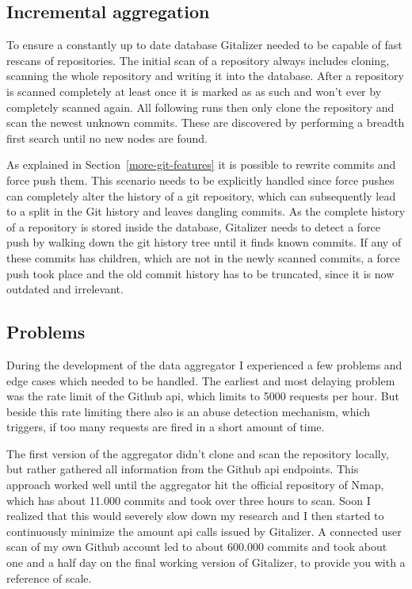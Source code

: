 \subsection{Incremental aggregation}
To ensure a constantly up to date database Gitalizer needed to be capable of fast rescans of repositories.
The initial scan of a repository always includes cloning, scanning the whole repository and writing it into the database.
After a repository is scanned completely at least once it is marked as as such and won't ever by completely scanned again.
All following runs then only clone the repository and scan the newest unknown commits.
These are discovered by performing a breadth first search until no new nodes are found.

As explained in Section~\ref{more-git-features} it is possible to rewrite commits and force push them.
This scenario needs to be explicitly handled since force pushes can completely alter the history of a git repository, which can subsequently lead to a split in the Git history and leaves dangling commits.
As the complete history of a repository is stored inside the database, Gitalizer needs to detect a force push by walking down the git history tree until it finds known commits.
If any of these commits has children, which are not in the newly scanned commits, a force push took place and the old commit history has to be truncated, since it is now outdated and irrelevant.


\subsection{Problems}
During the development of the data aggregator I experienced a few problems and edge cases which needed to be handled.
The earliest and most delaying problem was the rate limit of the Github \ac{api}, which limits to 5000 requests per hour.
But beside this rate limiting there also is an abuse detection mechanism, which triggers, if too many requests are fired in a short amount of time.

The first version of the aggregator didn't clone and scan the repository locally, but rather gathered all information from the Github \ac{api} endpoints.
This approach worked well until the aggregator hit the official repository of Nmap, which has about 11.000 commits and took over three hours to scan.
Soon I realized that this would severely slow down my research and I then started to continuously minimize the amount \ac{api} calls issued by Gitalizer.
A connected user scan of my own Github account led to about 600.000 commits and took about one and a half day on the final working version of Gitalizer, to provide you with a reference of scale.

